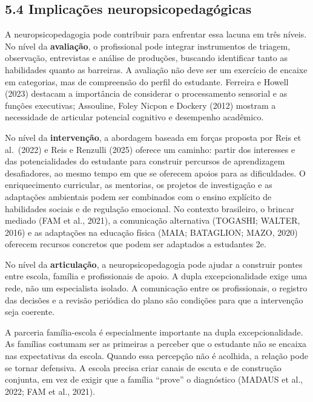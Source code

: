 \subsection{5.4 Implicações
neuropsicopedagógicas}\label{implicauxe7uxf5es-neuropsicopedaguxf3gicas}

A neuropsicopedagogia pode contribuir para enfrentar essa lacuna em três
níveis. No nível da \textbf{avaliação}, o profissional pode integrar
instrumentos de triagem, observação, entrevistas e análise de produções,
buscando identificar tanto as habilidades quanto as barreiras. A
avaliação não deve ser um exercício de encaixe em categorias, mas de
compreensão do perfil do estudante. Ferreira e Howell (2023) destacam a
importância de considerar o processamento sensorial e as funções
executivas; Assouline, Foley Nicpon e Dockery (2012) mostram a
necessidade de articular potencial cognitivo e desempenho acadêmico.

No nível da \textbf{intervenção}, a abordagem baseada em forças proposta
por Reis et al.~(2022) e Reis e Renzulli (2025) oferece um caminho:
partir dos interesses e das potencialidades do estudante para construir
percursos de aprendizagem desafiadores, ao mesmo tempo em que se
oferecem apoios para as dificuldades. O enriquecimento curricular, as
mentorias, os projetos de investigação e as adaptações ambientais podem
ser combinados com o ensino explícito de habilidades sociais e de
regulação emocional. No contexto brasileiro, o brincar mediado (FAM et
al., 2021), a comunicação alternativa (TOGASHI; WALTER, 2016) e as
adaptações na educação física (MAIA; BATAGLION; MAZO, 2020) oferecem
recursos concretos que podem ser adaptados a estudantes 2e.

No nível da \textbf{articulação}, a neuropsicopedagogia pode ajudar a
construir pontes entre escola, família e profissionais de apoio. A dupla
excepcionalidade exige uma rede, não um especialista isolado. A
comunicação entre os profissionais, o registro das decisões e a revisão
periódica do plano são condições para que a intervenção seja coerente.

A parceria família-escola é especialmente importante na dupla
excepcionalidade. As famílias costumam ser as primeiras a perceber que o
estudante não se encaixa nas expectativas da escola. Quando essa
percepção não é acolhida, a relação pode se tornar defensiva. A escola
precisa criar canais de escuta e de construção conjunta, em vez de
exigir que a família ``prove'' o diagnóstico (MADAUS et al., 2022; FAM
et al., 2021).

